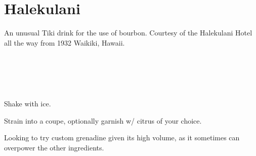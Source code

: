 \section[Halekulani]{Halekulani}\label{halekulani}

\begin{recipestats}[
        servings=1,
        preptime=5~\minute,
        original=\citefield{sippinSafari}{shorttitle} \cite{sippinSafari}
    ]
\end{recipestats}

\begin{recipeabstract}
    An unusual Tiki drink for the use of bourbon.
    Courtesy of the Halekulani Hotel all the way from 1932 Waikiki, Hawaii.
\end{recipeabstract}

\begin{ingredientcolumns}
    \begin{ingredientblock}
        \\
        \\
    \end{ingredientblock}
    \begin{ingredientblock}
        \\
    \end{ingredientblock}
\end{ingredientcolumns}

\begin{preparation}
\item Shake with ice.
\item Strain into a coupe, optionally garnish w/ citrus of your choice.
\end{preparation}

\begin{experiments}
\item Looking to try custom grenadine given its high volume, as it sometimes
    can overpower the other ingredients.
\end{experiments}

\recipeend
